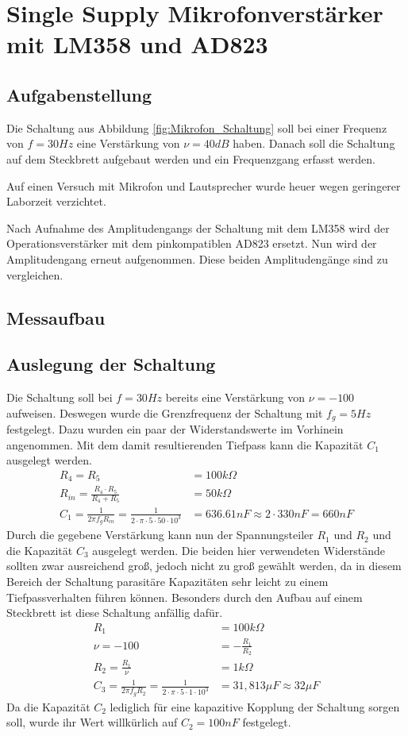 \section{Single Supply Mikrofonverstärker mit LM358 und AD823}
\subsection{Aufgabenstellung}
Die Schaltung aus Abbildung \ref{fig:Mikrofon_Schaltung} soll bei einer Frequenz von $f=30Hz$ eine Verstärkung von $\nu = 40dB$ haben. 
Danach soll die Schaltung auf dem Steckbrett aufgebaut werden und ein Frequenzgang erfasst werden.

Auf einen Versuch mit Mikrofon und Lautsprecher wurde heuer wegen geringerer Laborzeit verzichtet. 

Nach Aufnahme des Amplitudengangs der Schaltung mit dem LM358 wird der Operationsverstärker mit dem pinkompatiblen AD823 ersetzt. Nun wird der Amplitudengang erneut aufgenommen. Diese beiden Amplitudengänge sind zu vergleichen. 

\subsection{Messaufbau}
\subsection{Auslegung der Schaltung}
Die Schaltung soll bei $f=30Hz$ bereits eine Verstärkung von $\nu = -100$ aufweisen. Deswegen wurde die Grenzfrequenz der Schaltung mit $f_g=5Hz$ festgelegt. 
Dazu wurden ein paar der Widerstandswerte im Vorhinein angenommen. Mit dem damit resultierenden Tiefpass kann die Kapazität $C_1$ ausgelegt werden.
\begin{align}
    R_4=R_5 &= 100k\Omega \\
    R_{in} = \frac{R_4\cdot R_5}{R_4+ R_5} &= 50k\Omega \\
    C_1=\frac{1}{2\pi f_g R_{in}} = \frac{1}{2\cdot \pi \cdot 5\cdot50\cdot 10^3} &= 636.61nF \approx 2\cdot 330nF = 660nF
\end{align}
Durch die gegebene Verstärkung kann nun der Spannungsteiler $R_1$ und $R_2$ und die Kapazität $C_3$ ausgelegt werden. Die beiden hier verwendeten Widerstände sollten zwar ausreichend groß, jedoch nicht zu groß gewählt werden, da in diesem Bereich der Schaltung parasitäre Kapazitäten sehr leicht zu einem Tiefpassverhalten führen können. Besonders durch den Aufbau auf einem Steckbrett ist diese Schaltung anfällig dafür. 
\begin{align}
    R_1 &= 100k\Omega\\
    \nu = -100 &= -\frac{R_1}{R_2} \\
    R_2 = \frac{R_1}{\nu} &= 1k\Omega\\
    C_3=\frac{1}{2\pi f_g R_2} = \frac{1}{2\cdot \pi \cdot 5\cdot1\cdot 10^3} &= 31,813\mu F \approx 32\mu F
\end{align}
Da die Kapazität $C_2$ lediglich für eine kapazitive Kopplung der Schaltung sorgen soll, wurde ihr Wert willkürlich auf $C_2=100nF$ festgelegt. 

